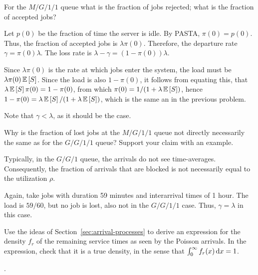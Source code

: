 \begin{question}
  For the $M/G/1/1$ queue what is the fraction of jobs rejected; what
  is the fraction of accepted jobs?
  \begin{solution}
 Let $p(0)$ be the fraction of time the server is idle. By
      PASTA, $\pi(0)=p(0)$. Thus, the fraction of accepted jobs is
      $\lambda\pi(0)$. Therefore, the departure rate
      $\gamma=\pi(0)\lambda$. The loss rate  is $\lambda-\gamma = (1-\pi(0))\lambda$. 

      Since $\lambda\pi(0)$ is the rate at which jobs enter the
      system, the load must be $\lambda\pi(0)\,\mathbb{E}\left[S\right]$. Since the load is also $1-\pi(0)$, it follows from equating this, that  $\lambda \,\mathbb{E}\left[S\right] \pi(0) = 1-\pi(0)$, from which $\pi(0)=1/(1+\lambda\,\mathbb{E}\left[S\right])$, hence $1-\pi(0) = \lambda \,\mathbb{E}\left[S\right]/(1+\lambda \,\mathbb{E}\left[S\right])$, which is the same an in the previous problem.

Note that  $\gamma < \lambda$, as it should be the case. 

  \end{solution}
\end{question}


\begin{question}
  Why is the fraction of lost jobs at the $M/G/1/1$ queue not directly
  necessarily the same as for the $G/G/1/1$ queue?  Support your claim
  with an example.
  \begin{solution}
 Typically, in the $G/G/1$ queue, the arrivals do not see  time-averages. Consequently, the fraction of arrivals that are blocked is not necessarily equal to the utilization $\rho$.

  Again, take jobs with duration 59 minutes and interarrival times of
  1 hour. The load is $59/60$, but no job is lost, also not in the
  $G/G/1/1$ case. Thus, $\gamma=\lambda$ in this case.
  \end{solution}
\end{question}


\begin{question}[use=false]
  Use the ideas of Section~\ref{sec:arrival-processes} to derive an
  expression for the density $f_r$ of the remaining service times as
  seen by the Poisson arrivals.  In the expression, check that it is a
  true density, in the sense that $\int_0^\infty f_r(x) \,\text{d}x =1$.
  \begin{solution}
    \TBD.
  \end{solution}
\end{question}





